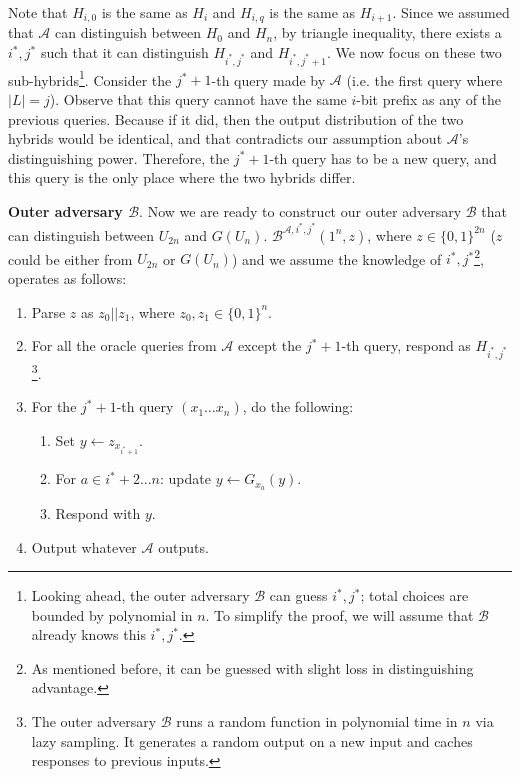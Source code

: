 \documentclass[12pt]{tufte-book}
\begin{document}
Note that $H_{i, 0}$ is the same as $H_i$ and $H_{i, q}$ is the same as $H_{i+1}$. Since we assumed that $\mathcal{A}$ can distinguish between $H_0$ and $H_n$, by triangle inequality, there exists a $i^*, j^*$ such that it can distinguish $H_{i^*,j^*}$ and $H_{i^*,j^*+1}$. We now focus on these two sub-hybrids\footnote{Looking ahead, the outer adversary $\mathcal{B}$ can guess $i^*, j^*$; total choices are bounded by polynomial in $n$. To simplify the proof, we will assume that $\mathcal{B}$ already knows this $i^*, j^*$.}. Consider the $j^*+1$-th query made by $\mathcal{A}$ (i.e. the first query where $|L|=j$). Observe that this query cannot have the same $i$-bit prefix as any of the previous queries. Because if it did, then the output distribution of the two hybrids would be identical, and that contradicts our assumption about $\mathcal{A}$'s distinguishing power. Therefore, the $j^*+1$-th query has to be a new query, and this query is the only place where the two hybrids differ.\smallskip

\noindent \textbf{Outer adversary $\mathcal{B}$}. Now we are ready to construct our outer adversary $\mathcal{B}$ that can distinguish between $U_{2n}$ and $G(U_n)$. $\mathcal{B}^{\mathcal{A}, i^*, j^*}(1^n, z)$, where $z \in \{0, 1\}^{2n}$ ($z$ could be either from $U_{2n}$ or $G(U_n)$) and we assume the knowledge of $i^*, j^*$\footnote{As mentioned before, it can be guessed with slight loss in distinguishing advantage.}, operates as follows:
\begin{enumerate}
    \item Parse $z$ as $z_0||z_1$, where $z_0, z_1 \in \{0, 1\}^n$.
    \item For all the oracle queries from $\mathcal{A}$ except the $j^*+1$-th query, respond as $H_{i^*,j^*}$\footnote{The outer adversary $\mathcal{B}$ runs a random function in polynomial time in $n$ via lazy sampling. It generates a random output on a new input and caches responses to previous inputs.}.
    \item For the $j^*+1$-th query $(x_1\dots x_n)$, do the following:
          \begin{enumerate}
              \item Set $y \gets z_{x_{i^*+1}}$.
              \item For $a \in i^*+2 \dots n$: update $y \gets G_{x_a}(y)$.
              \item Respond with $y$.
          \end{enumerate}
    \item Output whatever $\mathcal{A}$ outputs.
\end{enumerate}
\end{document}
